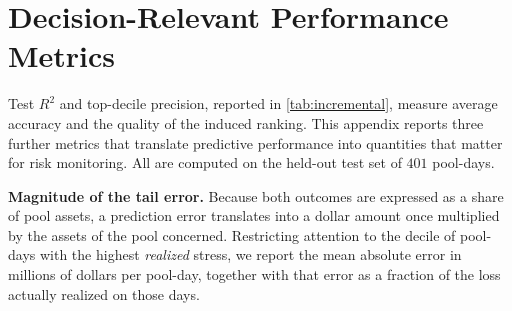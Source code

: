\documentclass[a4paper,UKenglish,cleveref, autoref, thm-restate]{informs3}
\newcommand{\rev}[1]{{\color{purple}#1}}
\newcommand{\boldpara}[1]{\noindent\textbf{#1}\quad}
\begin{document}

\newpage
\section{\rev{Decision-Relevant Performance Metrics}}
\label{app:decision_metrics}

\rev{Test $R^2$ and top-decile precision, reported in
\autoref{tab:incremental}, measure average accuracy and the
quality of the induced ranking. This appendix reports three
further metrics that translate predictive performance into
quantities that matter for risk monitoring. All are computed on the
held-out test set of $401$ pool-days.}

\medskip

\rev{\boldpara{Magnitude of the tail error.} Because both outcomes
are expressed as a share of pool assets, a prediction error
translates into a dollar amount once multiplied by the assets of
the pool concerned. Restricting attention to the decile of
pool-days with the highest \emph{realized} stress, we report the
mean absolute error in millions of dollars per pool-day, together
with that error as a fraction of the loss actually realized on
those days.}
\end{document}
